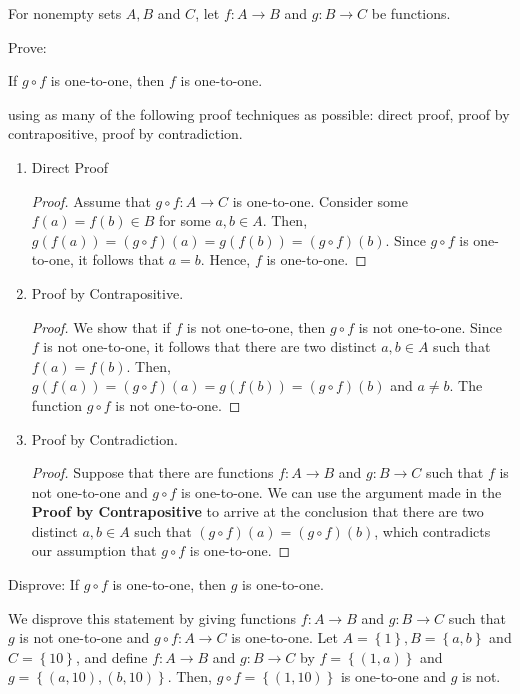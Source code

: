 \documentclass[12pt]{article}
\newenvironment{problem}[2][Problem]{\begin{trivlist} \item[\hskip \labelsep {\bfseries #1}\hskip \labelsep {\bfseries #2.}]}{\end{trivlist}}
\newenvironment{solution}[1][Solution]{\begin{trivlist} \item[\hskip \labelsep {\bfseries #1}]}{\end{trivlist}}
\begin{document}
    \begin{problem}{43}
      For nonempty sets $A, B$ and $C$, let $f:A\to B$ and $g:B\to C$ be functions.
    \begin{enumerate}
      \item Prove:
    \begin{center}
      If $g\circ f$ is one-to-one, then $f$ is one-to-one. 
    \end{center}
    using as many of the following proof techniques as possible: direct proof, proof by contrapositive, proof by contradiction.
    \begin{solution}
      \begin{enumerate}[label=(\roman*)]
      \item Direct Proof
    \begin{proof}
      Assume that $g\circ f: A\to C$ is one-to-one. Consider some $f(a)=f(b)\in B$ for some $a,b\in A$. Then, $g(f(a)) = (g\circ f)(a) = g(f(b)) = (g\circ f)(b)$. Since $g\circ f$ is one-to-one, it follows that $a=b$. Hence, $f$ is one-to-one.  
    \end{proof}
      \item Proof by Contrapositive.
    \begin{proof}
      We show that if $f$ is not one-to-one, then $g\circ f$ is not one-to-one. Since $f$ is not one-to-one, it follows that there are two distinct $a,b\in A$ such that $f(a) = f(b)$. Then, $g(f(a)) = (g\circ f)(a) = g(f(b)) = (g\circ f)(b)$ and $a\neq b$. The function $g\circ f$ is not one-to-one.
    \end{proof}
      \item Proof by Contradiction.
    \begin{proof}
      Suppose that there are functions $f:A\to B$ and $g:B\to C$ such that $f$ is not one-to-one and $g\circ f$ is one-to-one. We can use the argument made in the \textbf{Proof by Contrapositive} to arrive at the conclusion that there are two distinct $a,b\in A$ such that $(g\circ f)(a) = (g\circ f)(b)$, which contradicts our assumption that $g\circ f$ is one-to-one.
    \end{proof}
    \end{enumerate}
    \end{solution}
  \item Disprove: If $g\circ f$ is one-to-one, then $g$ is one-to-one.
    \begin{solution}
      We disprove this statement by giving functions $f:A\to B$ and $g:B\to C$ such that $g$ is not one-to-one and $g\circ f: A\to C$ is one-to-one. Let $A=\left\{ 1 \right\}, B=\left\{ a,b \right\}$ and $C=\left\{ 10 \right\}$, and define $f:A\to B$ and $g:B\to C$ by $f=\left\{ (1,a) \right\}$ and $g=\left\{ (a,10),(b,10) \right\}$. Then, $g\circ f = \left\{ (1,10) \right\}$ is one-to-one and $g$ is not.
    \end{solution}
    \end{enumerate}
    \end{problem}
    
\end{document}
